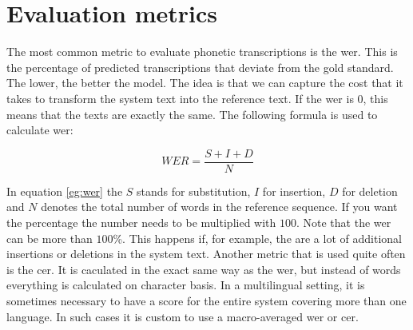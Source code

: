 \section{Evaluation metrics}
The most common metric to evaluate phonetic transcriptions is the \ac{wer}. This is the percentage of predicted transcriptions that deviate from the gold standard. The lower, the better the model. The idea is that we can capture the cost that it takes to transform the system text into the reference text. If the \ac{wer} is 0, this means that the texts are exactly the same. The following formula is used to calculate \ac{wer}:    

\begin{equation} 
\label{eq:wer}
WER = \frac{S+I+D}{N}
\end{equation}

In equation \ref{eg:wer} the $S$ stands for substitution, $I$ for insertion, $D$ for deletion and $N$ denotes the total number of words in the reference sequence. If you want the percentage the number needs to be multiplied with $100$. Note that the \ac{wer} can be more than $100$\%. This happens if, for example, the are a lot of additional insertions or deletions in the system text. Another metric that is used quite often is the \ac{cer}. It is caculated in the exact same way as the \ac{wer}, but instead of words everything is calculated on character basis. In a multilingual setting, it is sometimes necessary to have a score for the entire system covering more than one language. In such cases it is custom to use a macro-averaged \ac{wer} or \ac{cer}. 


